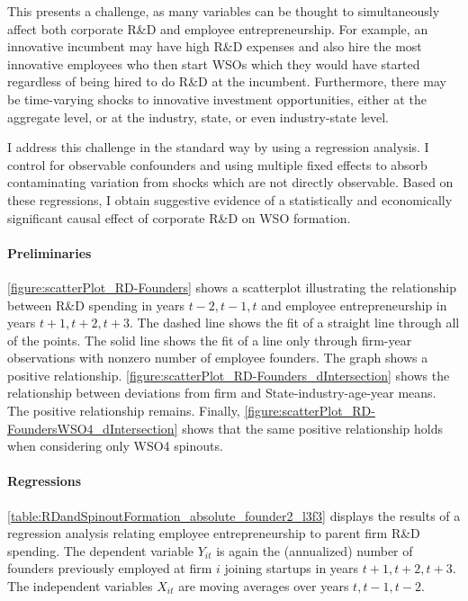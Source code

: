 \documentclass[11pt,english]{article}
\begin{document}
This presents a challenge, as many variables can be thought to simultaneously affect both corporate R\&D and employee entrepreneurship. For example, an innovative incumbent may have high R\&D expenses and also hire the most innovative employees who then start WSOs which they would have started regardless of being hired to do R\&D at the incumbent. Furthermore, there may be time-varying shocks to innovative investment opportunities, either at the aggregate level, or at the industry, state, or even industry-state level. 

I address this challenge in the standard way by using a regression analysis. I control for observable confounders and using multiple fixed effects to absorb contaminating variation from shocks which are not directly observable. Based on these regressions, I obtain suggestive evidence of a statistically and economically significant causal effect of corporate R\&D on WSO formation.

\paragraph{Preliminaries}

\autoref{figure:scatterPlot_RD-Founders} shows a scatterplot illustrating the relationship between R\&D spending in years $t-2,t-1,t$ and employee entrepreneurship in years $t+1,t+2,t+3$. The dashed line shows the fit of a straight line through all of the points. The solid line shows the fit of a line only through firm-year observations with nonzero number of employee founders. The graph shows a positive relationship. \autoref{figure:scatterPlot_RD-Founders_dIntersection} shows the relationship between deviations from firm and State-industry-age-year means. The positive relationship remains. Finally, \autoref{figure:scatterPlot_RD-FoundersWSO4_dIntersection} shows that the same positive relationship holds when considering only WSO4 spinouts. 


\paragraph{Regressions}

\autoref{table:RDandSpinoutFormation_absolute_founder2_l3f3} displays the results of a regression analysis relating employee entrepreneurship to parent firm R\&D spending. The dependent variable $Y_{it}$ is again the (annualized) number of founders previously employed at firm $i$ joining startups in years $t+1,t+2,t+3$. The independent variables $X_{it}$ are moving averages over years $t,t-1,t-2$. 
\end{document}
